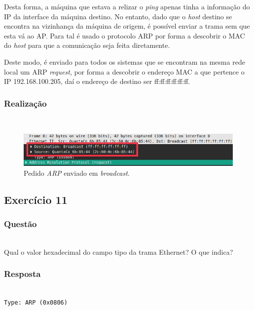 \documentclass{llncs}
\begin{document}
Desta forma, a máquina que estava a relizar o \textit{ping} apenas tinha a informação do IP da interface da máquina destino. No entanto, dado que o \textit{host} destino se encontra na vizinhança da máquina de origem, é possível enviar a trama sem que esta vá ao AP. Para tal é usado o protocolo ARP por forma a descobrir o MAC do \textit{host} para que a comunicação seja feita diretamente.

Deste modo, é enviado para todos os sistemas que se encontram na mesma rede local um ARP \textit{request}, por forma a descobrir o endereço MAC a que pertence o IP 192.168.100.205, daí o endereço de destino ser ff:ff:ff:ff:ff:ff. 

\subsubsection{Realização}\rule[-10pt]{0pt}{10pt}\\

\begin{figure}
  \begin{center}
	  \includegraphics[scale=0.6]{./imagens/arp_request.png} 
  \end{center}
	\caption{Pedido \textit{ARP} enviado em \textit{broadcast}.}
  \label{fig:arp_request}
\end{figure} 


\clearpage
\subsection{Exercício 11}
\subsubsection{Questão}\rule[-10pt]{0pt}{10pt}\\

Qual o valor hexadecimal do campo tipo da trama Ethernet? O que indica?

\subsubsection{Resposta}\rule[-10pt]{0pt}{10pt}\\

\texttt{Type: ARP (0x0806)} 
\end{document}
